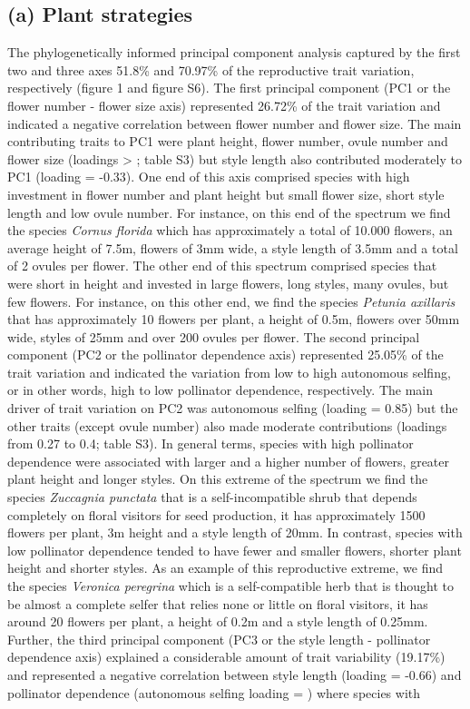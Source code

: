 \documentclass[
  12pt,
  a4paper,
]{article}
\begin{document}
\hypertarget{a-plant-strategies}{%
\subsection{(a) Plant strategies}\label{a-plant-strategies}}

The phylogenetically informed principal component analysis captured by the first two and three axes 51.8\% and 70.97\% of the reproductive trait variation, respectively (figure 1 and figure S6). The first principal component (PC1 or the flower number - flower size axis) represented 26.72\% of the trait variation and indicated a negative correlation between flower number and flower size. The main contributing traits to PC1 were plant height, flower number, ovule number and flower size (loadings \textgreater{} \textbar; table S3) but style length also contributed moderately to PC1 (loading = -0.33). One end of this axis comprised species with high investment in flower number and plant height but small flower size, short style length and low ovule number. For instance, on this end of the spectrum we find the species \emph{Cornus florida} which has approximately a total of 10.000 flowers, an average height of 7.5m, flowers of 3mm wide, a style length of 3.5mm and a total of 2 ovules per flower. The other end of this spectrum comprised species that were short in height and invested in large flowers, long styles, many ovules, but few flowers. For instance, on this other end, we find the species \emph{Petunia axillaris} that has approximately 10 flowers per plant, a height of 0.5m, flowers over 50mm wide, styles of 25mm and over 200 ovules per flower. The second principal component (PC2 or the pollinator dependence axis) represented 25.05\% of the trait variation and indicated the variation from low to high autonomous selfing, or in other words, high to low pollinator dependence, respectively. The main driver of trait variation on PC2 was autonomous selfing (loading = 0.85) but the other traits (except ovule number) also made moderate contributions (loadings from 0.27 to 0.4; table S3). In general terms, species with high pollinator dependence were associated with larger and a higher number of flowers, greater plant height and longer styles. On this extreme of the spectrum we find the species \emph{Zuccagnia punctata} that is a self-incompatible shrub that depends completely on floral visitors for seed production, it has approximately 1500 flowers per plant, 3m height and a style length of 20mm. In contrast, species with low pollinator dependence tended to have fewer and smaller flowers, shorter plant height and shorter styles. As an example of this reproductive extreme, we find the species \emph{Veronica peregrina} which is a self-compatible herb that is thought to be almost a complete selfer that relies none or little on floral visitors, it has around 20 flowers per plant, a height of 0.2m and a style length of 0.25mm. Further, the third principal component (PC3 or the style length - pollinator dependence axis) explained a considerable amount of trait variability (19.17\%) and represented a negative correlation between style length (loading = -0.66) and pollinator dependence (autonomous selfing loading = \textbar) where species with 
\end{document}
